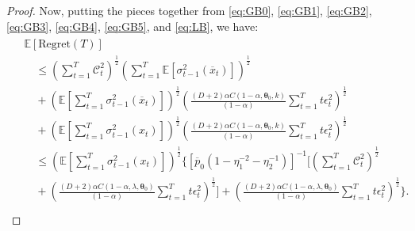 \documentclass[final,12pt]{colt2026} %
\begin{document}
\begin{proof}
Now, putting the pieces together from \eqref{eq:GB0}, \eqref{eq:GB1}, \eqref{eq:GB2}, \eqref{eq:GB3}, \eqref{eq:GB4}, \eqref{eq:GB5}, and \eqref{eq:LB}, we have:
\begin{align}
\begin{split}
    &\mathbb{E}[\mathrm{Regret}(T)]\\
    &\quad\leq  \left(\sum_{t=1}^{T} \mathcal{C}_t^2 \right)^{\frac{1}{2}} \left(\sum_{t=1}^{T} \mathbb{E}[\sigma_{t-1}^2(\overline{x}_t)] \right)^{\frac{1}{2}}\\
    &\quad + \left( \mathbb{E} \left[ \sum_{t=1}^T \sigma_{t-1}^2(\overline{x}_t)\right]  \right)^{\frac{1}{2}} \left(  \frac{(D+2)\alpha C(1-\alpha,\pmb\theta_0,k)}{ (1-\alpha)}  \sum_{t=1}^T  t\epsilon_t^2\right)^{\frac{1}{2}}\\
    &\quad + \left( \mathbb{E} \left[ \sum_{t=1}^T \sigma_{t-1}^2( x_t)\right]  \right)^{\frac{1}{2}} \left(  \frac{(D+2)\alpha C(1-\alpha,\pmb\theta_0,k)}{ (1-\alpha)}  \sum_{t=1}^T  t\epsilon_t^2\right)^{\frac{1}{2}}\\
    &\quad \leq \left(\mathbb{E}\left[\sum_{t=1}^{T}\sigma_{t-1}^{2}(x_t)\right]\right)^{\frac{1}{2}}\bigg\{[\overline{p}_0(1-\eta_1^{-2}-\eta_2^{-1})]^{-1}\bigg[\left(\sum_{t=1}^{T}\mathcal{C}_t^2\right)^{\frac{1}{2}}\\
    &\quad + \left(\frac{(D+2)\alpha C(1-\alpha, \lambda, \pmb{\theta}_0)}{(1-\alpha)}\sum_{t=1}^{T}t\epsilon_t^2\right)^{\frac{1}{2}} \bigg] + \left(\frac{(D+2)\alpha C(1-\alpha, \lambda, \pmb{\theta}_0)}{(1-\alpha)}\sum_{t=1}^{T}t\epsilon_t^2\right)^{\frac{1}{2}}\bigg\}.\\

\end{split}
\end{align}
\end{proof}
\end{document}
